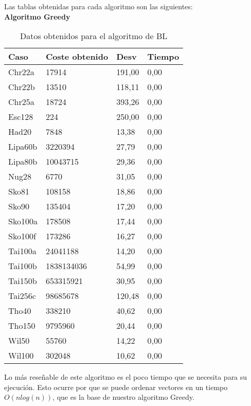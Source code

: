 Las tablas obtenidas para cada algoritmo son las siguientes:\\


\textbf{Algoritmo Greedy}
\begin{table}[htbp]
	\begin{center}
		\begin{tabular}{|l|l|l|l|}
			\hline
			Caso & Coste obtenido & Desv & Tiempo\\
			\hline \hline
			Chr22a& 17914& 191,00& 0,00\\ \hline
			Chr22b& 13510& 118,11& 0,00\\ \hline
			Chr25a& 18724& 393,26& 0,00\\ \hline
			Esc128& 224& 250,00& 0,00\\ \hline
			Had20& 7848& 13,38& 0,00\\ \hline
			Lipa60b& 3220394& 27,79& 0,00\\ \hline
			Lipa80b& 10043715& 29,36& 0,00\\ \hline
			Nug28& 6770& 31,05& 0,00\\ \hline
			Sko81& 108158& 18,86& 0,00\\ \hline
			Sko90& 135404& 17,20& 0,00\\ \hline
			Sko100a& 178508& 17,44& 0,00\\ \hline
			Sko100f& 173286& 16,27& 0,00\\ \hline
			Tai100a& 24041188& 14,20& 0,00\\ \hline
			Tai100b& 1838134036& 54,99& 0,00\\ \hline
			Tai150b& 653315921& 30,95& 0,00\\ \hline
			Tai256c& 98685678& 120,48& 0,00\\ \hline
			Tho40& 338210& 40,62& 0,00\\ \hline
			Tho150& 9795960& 20,44& 0,00\\ \hline
			Wil50& 55760& 14,22& 0,00\\ \hline
			Wil100& 302048& 10,62& 0,00\\ \hline
		\end{tabular}
		\caption{Datos obtenidos para el algoritmo de BL}
		\label{tabla:DatosGreedy}
	\end{center}
\end{table}

Lo más reseñable de este algoritmo es el poco tiempo que se necesita para su ejecución. Esto ocurre por que se puede ordenar vectores en un tiempo $O(nlog(n))$, que es la base de nuestro algoritmo Greedy. \\

